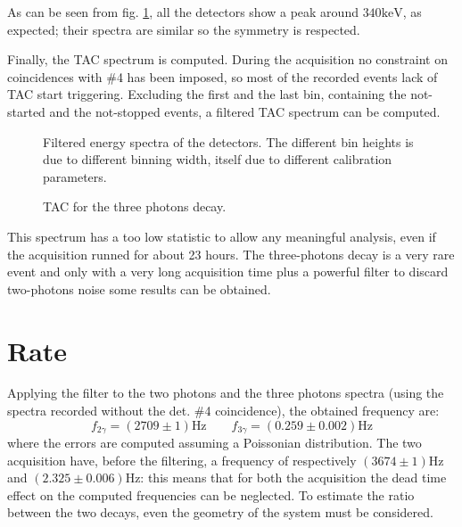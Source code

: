 \documentclass[11pt,a4 paper]{article}
\begin{document}
As can be seen from fig. \ref{fig:alldet:3gamma}, all the detectors show a peak around $340\si{\kilo\electronvolt}$, as expected; their spectra are similar so the symmetry is respected.

Finally, the TAC spectrum is computed. During the acquisition no constraint on coincidences with \#4 has been imposed, so most of the recorded events lack of TAC start triggering. Excluding the first and the last bin, containing the not-started and the not-stopped events, a filtered TAC spectrum can be computed.

\begin{figure}[H]
    \centering
    \caption{Filtered energy spectra of the detectors. The different bin heights is due to different binning width, itself due to different calibration parameters.}
    \label{fig:alldet:3gamma}
\end{figure}

\begin{figure}[H]
    \centering
    \caption{TAC for the three photons decay.}
    \label{fig:tac:3gamma}
\end{figure}


This spectrum has a too low statistic to allow any meaningful analysis, even if the acquisition runned for about 23 hours. The three-photons decay is a very rare event and only with a very long acquisition time plus a powerful filter to discard two-photons noise some results can be obtained.

\section{Rate}

Applying the filter to the two photons and the three photons spectra (using the spectra recorded without the det. \#4 coincidence), the obtained frequency are:
\begin{equation*}
    f_{2\gamma} = (2709 \pm 1)\si{\hertz} \qquad f_{3\gamma} = (0.259 \pm 0.002)\si{\hertz}
\end{equation*}
where the errors are computed assuming a Poissonian distribution. The two acquisition have, before the filtering, a frequency of respectively $(3674\pm1)\si{\hertz}$ and $(2.325\pm0.006)\si{\hertz}$: this means that for both the acquisition the dead time effect on the computed frequencies can be neglected. To estimate the ratio between the two decays, even the geometry of the system must be considered.
\end{document}
